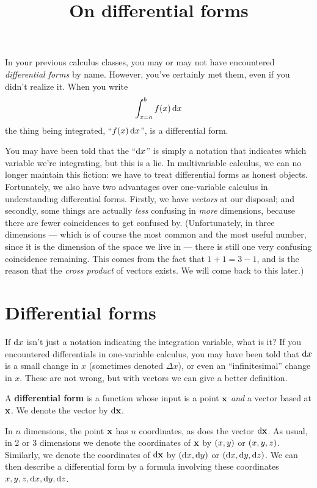 \documentclass[12pt]{amsart}
\title{On differential forms}
\begin{document}
\maketitle

In your previous calculus classes, you may or may not have encountered \emph{differential forms} by name.
However, you've certainly met them, even if you didn't realize it.
When you write
\[ \int_{x=a}^b f(x) \,{\mathrm{d} x} \]
the thing being integrated, ``$f(x) \,{\mathrm{d} x}$'', is a differential form.

You may have been told that the ``${\mathrm{d} x}$'' is simply a notation that indicates which variable we're integrating, but this is a lie.
In multivariable calculus, we can no longer maintain this fiction: we have to treat differential forms as honest objects.
Fortunately, we also have two advantages over one-variable calculus in understanding differential forms.
Firstly, we have \emph{vectors} at our disposal; and secondly, some things are actually \emph{less} confusing in \emph{more} dimensions, because there are fewer coincidences to get confused by.
(Unfortunately, in three dimensions --- which is of course the most common and the most useful number, since it is the dimension of the space we live in --- there is still one very confusing coincidence remaining.
This comes from the fact that $1+1=3-1$, and is the reason that the \emph{cross product} of vectors exists.
We will come back to this later.)

\section{Differential forms}
\label{sec:differential-forms}

If ${\mathrm{d} x}$ isn't just a notation indicating the integration variable, what is it?
If you encountered differentials in one-variable calculus, you may have been told that ${\mathrm{d} x}$ is a small change in $x$ (sometimes denoted $\Delta x$), or even an ``infinitesimal'' change in $x$.
These are not wrong, but with vectors we can give a better definition.

\begin{defn}
  A \textbf{differential form} is a function whose input is a point $\mathbf{x}$ \emph{and} a vector based at $\mathbf{x}$.
  We denote the vector by ${\mathrm{d} \mathbf{x}}$.
\end{defn}

In $n$ dimensions, the point $\mathbf{x}$ has $n$ coordinates, as does the vector ${\mathrm{d} \mathbf{x}}$.
As usual, in 2 or 3 dimensions we denote the coordinates of $\mathbf{x}$ by $(x,y)$ or $(x,y,z)$.
Similarly, we denote the coordinates of ${\mathrm{d} \mathbf{x}}$ by $({\mathrm{d} x},{\mathrm{d} y})$ or $({\mathrm{d} x},{\mathrm{d} y},{\mathrm{d} z})$.
We can then describe a differential form by a formula involving these coordinates $x,y,z,{\mathrm{d} x},{\mathrm{d} y},{\mathrm{d} z}$.
\end{document}
